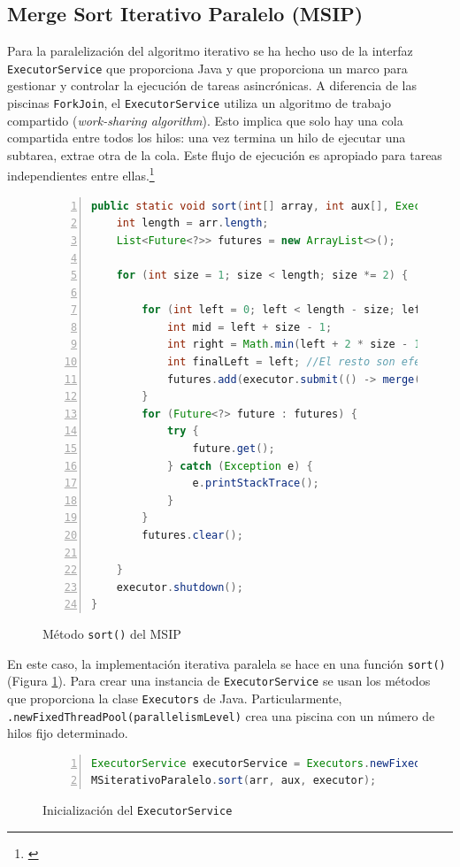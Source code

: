 \documentclass[titlepage]{article}
\begin{document}
\newpage
\subsection{Merge Sort Iterativo Paralelo (MSIP)} %
Para la paralelización del algoritmo iterativo se ha hecho uso de la interfaz \lstinline|ExecutorService| que proporciona Java y que proporciona un marco para gestionar y controlar la ejecución de tareas asincrónicas. A diferencia de las piscinas \lstinline|ForkJoin|, el \lstinline|ExecutorService| utiliza un algoritmo de trabajo compartido (\textit{work-sharing algorithm}). Esto implica que solo hay una cola compartida entre todos los hilos: una vez termina un hilo de ejecutar una subtarea, extrae otra de la cola. Este flujo de ejecución es apropiado para tareas independientes entre ellas.\footnote{\cite{OracleExecutorService}}

\begin{figure}[h]
	\centering
	\begin{lstlisting}[language=java, frame=single, numbers=left]
public static void sort(int[] array, int aux[], ExecutorService executor) {
	int length = arr.length;
	List<Future<?>> futures = new ArrayList<>();
	
	for (int size = 1; size < length; size *= 2) {
		
		for (int left = 0; left < length - size; left += 2 * size) {
			int mid = left + size - 1;
			int right = Math.min(left + 2 * size - 1, length - 1);
			int finalLeft = left; //El resto son efectivamente finales
			futures.add(executor.submit(() -> merge(arr, aux, finalLeft, mid, right)));
		}
		for (Future<?> future : futures) {
			try {
				future.get();
			} catch (Exception e) {
				e.printStackTrace();
			}
		}
		futures.clear();
		
	}
	executor.shutdown();
}
	\end{lstlisting}
	
	\caption{Método \lstinline{sort()} del MSIP}
	\label{fig:MSIP_sort()}
\end{figure}

En este caso, la implementación iterativa paralela se hace en una función \lstinline|sort()| (Figura \ref{fig:MSIP_sort()}). Para crear una instancia de \lstinline|ExecutorService| se usan los métodos que proporciona la clase \lstinline|Executors| de Java. Particularmente, \lstinline|.newFixedThreadPool(parallelismLevel)| crea una piscina con un número de hilos fijo determinado.

\begin{figure}[h]
	\begin{lstlisting}[language=java, frame=single, numbers=left]
ExecutorService executorService = Executors.newFixedThreadPool(parallelismLevel);
MSiterativoParalelo.sort(arr, aux, executor);
	\end{lstlisting}
	\caption{Inicialización del \lstinline{ExecutorService}}
	\label{fig:creacionExecutorService}
\end{figure}
\end{document}
